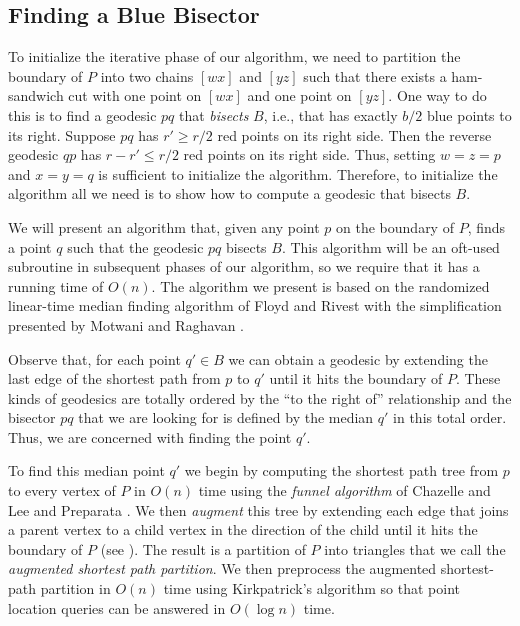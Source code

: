 \documentclass[charterfonts,lotsofwhite]{patmorin}
\newcommand{\chain}[2]{[#1#2]}
\begin{document}
\subsection{Finding a Blue Bisector}

To initialize the iterative phase of our algorithm, we need to
partition the boundary of $P$ into two chains $\chain{w}{x}$ and
$\chain{y}{z}$ such that there exists a ham-sandwich cut with one point
on $\chain{w}{x}$ and one point on $\chain{y}{z}$.  One way to do this is
to find a geodesic $pq$ that \emph{bisects} $B$, i.e., that has
exactly $b/2$ blue points to its right.  Suppose $pq$ has $r'\ge r/2$
red points on its right side. Then the reverse geodesic $qp$ has
$r-r'\le r/2$ red points on its right side.  Thus, setting $w=z=p$ and
$x=y=q$ is sufficient to initialize the algorithm.   Therefore, to
initialize the algorithm all we need is to show how to compute a
geodesic that bisects $B$.

We will present an algorithm that, given any point $p$ on the boundary
of $P$, finds a point $q$ such that the geodesic $pq$ bisects $B$.
This algorithm will be an oft-used subroutine in subsequent phases of
our algorithm, so we require that it has a running time of $O(n)$.
The algorithm we present is based on the randomized linear-time median
finding algorithm of Floyd and Rivest \cite{fr75} with the
simplification presented by Motwani and Raghavan
\cite[Section~3.3]{mr95}.  

Observe that, for each point $q'\in B$ we can obtain a geodesic by
extending the last edge of the shortest path from $p$ to $q'$ until it
hits the boundary of $P$.  These kinds of geodesics are totally
ordered by the ``to the right of'' relationship and the bisector $pq$
that we are looking for is defined by the median $q'$ in this total
order.  Thus, we are concerned with finding the point $q'$. 

To find this median point $q'$ we begin by computing the shortest path
tree from $p$ to every vertex of $P$ in $O(n)$ time using the
\emph{funnel algorithm} of Chazelle \cite{c82} and Lee and Preparata
\cite{lp94}.  We then \emph{augment} this tree by extending each edge
that joins a parent vertex to a child vertex in the direction of the
child until it hits the boundary of $P$ (see
). The result is a partition of $P$ into
triangles that we call the \emph{augmented shortest path partition}.
We then preprocess the augmented shortest-path partition in $O(n)$
time using Kirkpatrick's algorithm \cite{k83} so that point location
queries can be answered in $O(\log n)$ time.
\end{document}

